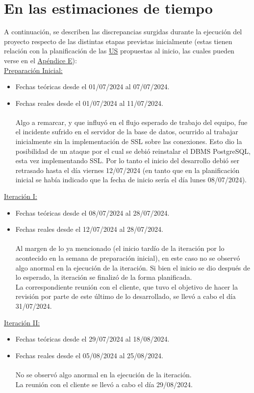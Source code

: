 \documentclass[a4paper, 12pt,twoside]{report}  %
\numberwithin{equation}{subsection} %
\begin{document}
\section{En las estimaciones de tiempo}
\label{en_las_estimaciones_de_tiempo}
A continuación, se describen las discrepancias surgidas durante la ejecución del proyecto respecto de las distintas etapas previstas inicialmente (estas tienen relación con la planificación de las \hyperlink{US}{US} propuestas al inicio, las cuales pueden verse en el \hyperlink{apendice_e}{Apéndice E}):\\
\noindent\underline{Preparación Inicial:}
\begin{itemize}
	\item Fechas teóricas desde el 01/07/2024 al 07/07/2024.
	\item Fechas reales desde el 01/07/2024 al 11/07/2024.\\\\
	Algo a remarcar, y que influyó en el flujo esperado de trabajo del equipo, fue el incidente sufrido en el servidor de la base de datos, ocurrido al trabajar inicialmente sin la implementación de SSL sobre las conexiones. Esto dio la posibilidad de un ataque por el cual se debió reinstalar el DBMS PostgreSQL, esta vez implementando SSL. Por lo tanto el inicio del desarrollo debió ser retrasado hasta el día viernes 12/07/2024 (en tanto que en la planificación inicial se había indicado que la fecha de inicio sería el día lunes 08/07/2024).
\end{itemize}
\noindent\underline{Iteración I:}
\begin{itemize}
	\item Fechas teóricas desde el 08/07/2024 al 28/07/2024.
	\item Fechas reales desde el 12/07/2024 al 28/07/2024.\\\\
	Al margen de lo ya mencionado (el inicio tardío de la iteración por lo acontecido en la semana de preparación inicial), en este caso no se observó algo anormal en la ejecución de la iteración. Si bien el inicio se dio después de lo esperado, la iteración se finalizó de la forma planificada.\\
	La correspondiente reunión con el cliente, que tuvo el objetivo de hacer la revisión por parte de este último de lo desarrollado, se llevó a cabo el día 31/07/2024.
\end{itemize}
\underline{Iteración II:}
\begin{itemize}
	\item Fechas teóricas desde el 29/07/2024 al 18/08/2024.
	\item Fechas reales desde el 05/08/2024 al 25/08/2024.\\\\
	No se observó algo anormal en la ejecución de la iteración.\\
	La reunión con el cliente se llevó a cabo el día 29/08/2024.
\end{itemize}
\end{document}
